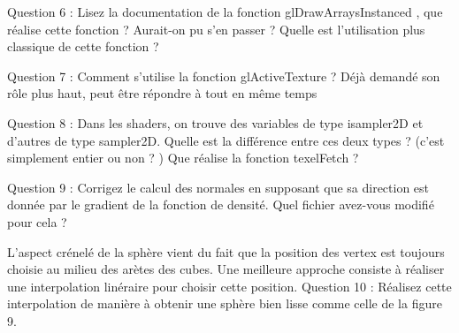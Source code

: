 \documentclass[a4paper]{article}
\begin{document}
Question 6 : Lisez la documentation de la fonction glDrawArraysInstanced , que réalise cette fonction ? Aurait-on pu s’en
passer ? Quelle est l’utilisation plus classique de cette fonction ?



Question 7 : Comment s’utilise la fonction glActiveTexture ? Déjà demandé son rôle plus haut, peut être répondre à tout en même temps



Question 8 : Dans les shaders, on trouve des variables de type isampler2D et d’autres de type sampler2D. Quelle est la
différence entre ces deux types ? (c'est simplement entier ou non ? ) Que réalise la fonction texelFetch ?


Question 9 : Corrigez le calcul des normales en supposant que sa direction est donnée par le gradient de la fonction de
densité. Quel fichier avez-vous modifié pour cela ?



L’aspect crénelé de la sphère vient du fait que la position des vertex est toujours choisie au milieu des arètes des cubes.
Une meilleure approche consiste à réaliser une interpolation linéraire pour choisir cette position.
Question 10 : Réalisez cette interpolation de manière à obtenir une sphère bien lisse comme celle de la figure 9.



\end{document}
